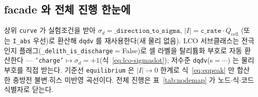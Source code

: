 \documentclass[11pt,a4paper]{article}
\newcommand{\cell}{\mathrm{cell}}
\newcommand{\code}[1]{\texttt{#1}}
\begin{document}
\subsection{facade 와 전체 진행 한눈에}\label{sec:facade}
상위 \code{curve} 가 실험조건을 받아 $\sigma_d=\code{\_direction\_to\_sigma}$, $|I|=\code{c\_rate}\cdot Q_\cell$
(또는 \code{I\_abs} 우선)로 환산해 \code{dqdv} 를 재사용한다(새 물리 없음). LCO 서브클래스는 전극 인지
플래그(\code{\_delith\_is\_discharge}$=$False)로 셀 라벨을 탈리튬화 부호로 자동 환산한다 —
\code{'charge'}$\mapsto\sigma_d{=}+1$(식~\eqref{eq:lco-sigmaslot}); 저수준 \code{dqdv}(s$=\cdots$) 는 물리
부호를 직접 받는다. 기준선 \code{equilibrium} 은
$|I|\to0$ 한계로 식~\eqref{eq:eqpeak} 만 합산한 충방전 불변$\cdot$히스 미반영 곡선이다. 전체 진행은 표~\ref{tab:nodemap}
가 노드$\cdot$식$\cdot$코드 식별자로 닫는다.
\end{document}
